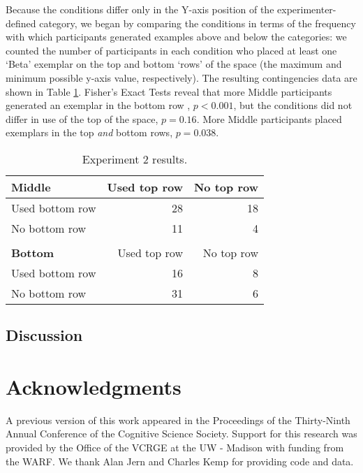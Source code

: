 \documentclass[12pt]{article}
\begin{document}
\begin{flushleft}
Because the conditions differ only in the Y-axis position of the experimenter-defined category, we began by comparing the conditions in terms of the frequency with which participants generated examples above and below the categories: we counted the number of participants in each condition who placed at least one `Beta' exemplar on the top and bottom `rows' of the space (the maximum and minimum possible y-axis value, respectively). The resulting contingencies data are shown in Table \ref{table:e2-subset-table}. Fisher's Exact Tests reveal that more Middle participants generated an exemplar in the bottom row , $p < 0.001$, but the conditions did not differ in use of the top of the space, $p = 0.16$. More Middle participants placed exemplars in the top \textit{and} bottom rows, $p = 0.038$. 

\begin{table}
\begin{center} 
\caption{Experiment 2 results.} 
\label{table:e2-subset-table} 
\vskip 0.12in
\begin{tabular}{ l r r}
    \textbf{Middle}         & Used top row & No top row \\
    \hline
    Used bottom row       &  28 & 18  \\
    No bottom row          &  11 &  4  \\
    \\
    \textbf{Bottom}         & Used top row & No top row \\
    \hline
    Used bottom row        & 16 & 8 \\
    No bottom row          & 31 & 6 \\
\end{tabular}
\end{center} 
\end{table}

\subsection{Discussion}









\clearpage




\section{Acknowledgments}
A previous version of this work appeared in the Proceedings of the Thirty-Ninth Annual Conference of the Cognitive Science Society. Support for this research was provided by the Office of the VCRGE at the UW - Madison with funding from the WARF. We thank Alan Jern and Charles Kemp for providing code and data.



\end{flushleft}
\end{document}
